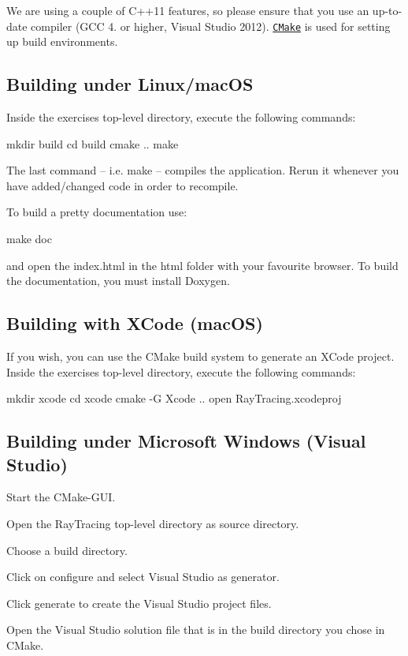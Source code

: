 We are using a couple of C++11 features, so please ensure that you use an up-\/to-\/date compiler (G\+CC 4. or higher, Visual Studio 2012). \href{www.cmake.org}{\tt C\+Make} is used for setting up build environments.

\subsection*{Building under Linux/mac\+OS }

Inside the exercise\textquotesingle{}s top-\/level directory, execute the following commands\+: \begin{DoxyVerb}mkdir build
cd build
cmake ..
make
\end{DoxyVerb}


The last command -- i.\+e. {\ttfamily make} -- compiles the application. Rerun it whenever you have added/changed code in order to recompile.

To build a pretty documentation use\+: \begin{DoxyVerb}make doc
\end{DoxyVerb}


and open the {\ttfamily index.\+html} in the html folder with your favourite browser. To build the documentation, you must install Doxygen.

\subsection*{Building with X\+Code (mac\+OS) }

If you wish, you can use the C\+Make build system to generate an X\+Code project. Inside the exercise\textquotesingle{}s top-\/level directory, execute the following commands\+: \begin{DoxyVerb}mkdir xcode
cd xcode
cmake -G Xcode ..
open RayTracing.xcodeproj
\end{DoxyVerb}


\subsection*{Building under Microsoft Windows (Visual Studio) }


\begin{DoxyItemize}
\item Start the C\+Make-\/\+G\+UI.
\item Open the Ray\+Tracing top-\/level directory as source directory.
\item Choose a build directory.
\item Click on configure and select Visual Studio as generator.
\item Click generate to create the Visual Studio project files.
\item Open the Visual Studio solution file that is in the build directory you chose in C\+Make.
\end{DoxyItemize}

